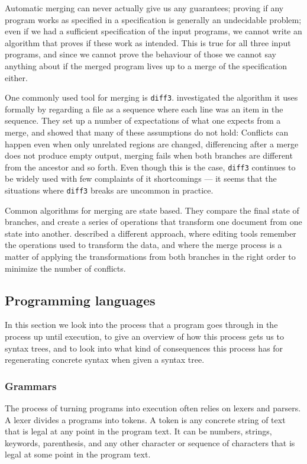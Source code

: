 \documentclass[11pt]{article}
\begin{document}
Automatic merging can never actually give us any guarantees; proving if any program works as specified in a specification is generally an undecidable problem; even if we had a sufficient specification of the input programs, we cannot write an algorithm that proves if these work as intended. This is true for all three input programs, and since we cannot prove the behaviour of those we cannot say anything about if the merged program lives up to a merge of the specification either.

One commonly used tool for merging is \texttt{diff3}. \citet{Khanna} investigated the algorithm it uses formally by regarding a file as a sequence where each line was an item in the sequence. They set up a number of expectations of what one expects from a merge, and showed that many of these assumptions do not hold: Conflicts can happen even when only unrelated regions are changed, differencing after a merge does not produce empty output, merging fails when both branches are different from the ancestor and so forth. Even though this is the case, \texttt{diff3} continues to be widely used with few complaints of it shortcomings --- it seems that the situations where \texttt{diff3} breaks are uncommon in practice.

Common algorithms for merging are state based. They compare the final state of branches, and create a series of operations that transform one document from one state into another. \citet{Lippe} described a different approach, where editing tools remember the operations used to transform the data, and where the merge process is a matter of applying the transformations from both branches in the right order to minimize the number of conflicts.



\subsection{Programming languages}
In this section we look into the process that a program goes through in the process up until execution, to give an overview of how this process gets us to syntax trees, and to look into what kind of consequences this process has for regenerating concrete syntax when given a syntax tree.

\subsubsection{Grammars}
The process of turning programs into execution often relies on lexers and parsers. A lexer divides a programs into tokens. A token is any concrete string of text that is legal at any point in the program text. It can be numbers, strings, keywords, parenthesis, and any other character or sequence of characters that is legal at some point in the program text. 
\end{document}
